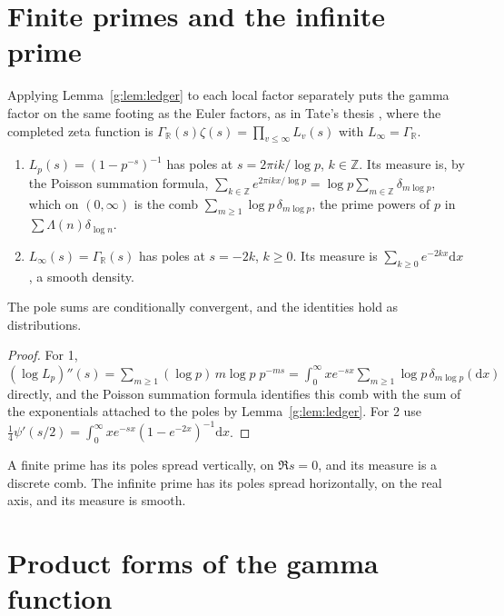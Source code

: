 \section{Finite primes and the infinite prime}\label{g:sec:local}

Applying Lemma~\ref{g:lem:ledger} to each local factor separately puts the gamma factor on the same footing as the Euler factors, as in Tate's thesis \cite{Tate67}, where the completed zeta function is $\Gamma_{\mathbb R}(s)\zeta(s)=\prod_{v\le\infty}L_v(s)$ with $L_\infty=\Gamma_{\mathbb R}$.

\begin{proposition}\label{g:prop:local}
\begin{enumerate}
\item $L_p(s)=(1-p^{-s})^{-1}$ has poles at $s=2\pi ik/\log p$, $k\in\mathbb Z$. Its measure is, by the Poisson summation formula, $\sum_{k\in\mathbb Z}e^{2\pi ikx/\log p}=\log p\sum_{m\in\mathbb Z}\delta_{m\log p}$, which on $(0,\infty)$ is the comb $\sum_{m\ge1}\log p\,\delta_{m\log p}$, the prime powers of $p$ in $\sum\Lambda(n)\delta_{\log n}$.
\item $L_\infty(s)=\Gamma_{\mathbb R}(s)$ has poles at $s=-2k$, $k\ge0$. Its measure is $\sum_{k\ge0}e^{-2kx}\mathrm dx$, a smooth density.
\end{enumerate}
The pole sums are conditionally convergent, and the identities hold as distributions.
\end{proposition}

\begin{proof}
For 1, $(\log L_p)''(s)=\sum_{m\ge1}(\log p)\,m\log p\;p^{-ms}=\allowbreak\int_0^\infty xe^{-sx}\allowbreak\sum_{m\ge1}\allowbreak\log p\,\delta_{m\log p}(\mathrm dx)$ directly, and the Poisson summation formula identifies this comb with the sum of the exponentials attached to the poles by Lemma~\ref{g:lem:ledger}. For 2 use $\frac14\psi'(s/2)=\int_0^\infty xe^{-sx}(1-e^{-2x})^{-1}\mathrm dx$.
\end{proof}

A finite prime has its poles spread vertically, on $\Re s=0$, and its measure is a discrete comb. The infinite prime has its poles spread horizontally, on the real axis, and its measure is smooth.

\section{Product forms of the gamma function}\label{g:sec:euler}

